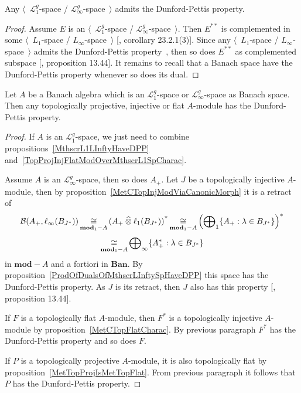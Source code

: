 \begin{proposition}\label{MthscrL1LInftyHaveDPP} Any
$\langle$~$\mathscr{L}_1^g$-space / $\mathscr{L}_\infty^g$-space~$\rangle$
admits the Dunford-Pettis property.
\end{proposition}
\begin{proof} Assume $E$ is an $\langle$~$\mathscr{L}_1^g$-space /
$\mathscr{L}_\infty^g$-space~$\rangle$. Then $E^{**}$ is complemented in some
$\langle$~$L_1$-space / $L_\infty$-space~$\rangle$ [\cite{DefFloTensNorOpId},
corollary 23.2.1(3)]. Since any $\langle$~$L_1$-space /
$L_\infty$-space~$\rangle$ admits the Dunford-Pettis
property~\cite{GrothApllFaiblCompSpCK}, then so does $E^{**}$ as complemented
subspace [\cite{FabHabBanSpTh}, proposition 13.44]. It remains to recall that a
Banach space have the Dunford-Pettis property whenever so does its dual.
\end{proof}

\begin{theorem}\label{TopProjInjFlatModOverMthscrL1OrLInftySpHaveDPP} Let $A$ be
a Banach algebra which is an $\mathscr{L}_1^g$-space or
$\mathscr{L}_\infty^g$-space as Banach space. Then any topologically projective,
injective or flat $A$-module has the Dunford-Pettis property.
\end{theorem}
\begin{proof} If $A$ is an $\mathscr{L}_1^g$-space, we just need to combine
propositions~\ref{MthscrL1LInftyHaveDPP}
and~\ref{TopProjInjFlatModOverMthscrL1SpCharac}. 

Assume $A$ is an $\mathscr{L}_\infty^g$-space, then so does $A_+$. Let $J$ be a
topologically injective $A$-module, then by
proposition~\ref{MetCTopInjModViaCanonicMorph} it is a retract of 
$$
\mathcal{B}(A_+,\ell_\infty(B_{J^*}))
\mathop{\mathbin{\cong}}\limits_{\mathbf{mod}_1-A}
{(A_+\mathbin{\widehat{\otimes}}\ell_1(B_{J^*}))}^*
\mathop{\mathbin{\cong}}\limits_{\mathbf{mod}_1-A}
{\left(\bigoplus\nolimits_1 \{ A_+:\lambda\in B_{J^*} \}\right)}^*
$$
$$
\mathop{\mathbin{\cong}}\limits_{\mathbf{mod}_1-A}
\bigoplus\nolimits_\infty \{ A_+^*:\lambda\in B_{J^*} \}
$$ 
in $\mathbf{mod}-A$ and a fortiori in $\mathbf{Ban}$. By
proposition~\ref{ProdOfDualsOfMthscrLInftySpHaveDPP} this space has the
Dunford-Pettis property. As $J$ is its retract, then $J$ also has this property
[\cite{FabHabBanSpTh}, proposition 13.44]. 

If $F$ is a topologically flat $A$-module, then $F^*$ is a topologically
injective $A$-module by proposition~\ref{MetCTopFlatCharac}. By previous
paragraph $F^*$ has the Dunford-Pettis property and so does $F$.

If $P$ is a topologically projective $A$-module, it is also topologically flat
by proposition~\ref{MetTopProjIsMetTopFlat}. From previous paragraph it follows
that $P$ has the Dunford-Pettis property.
\end{proof}

